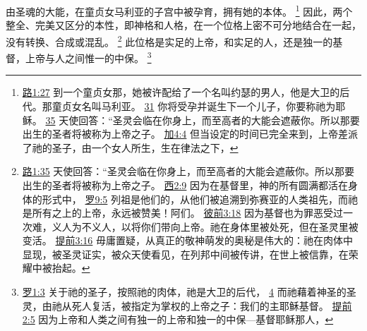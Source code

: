 \documentclass[12pt, a4paper, oneside]{ctexart}
\begin{document}
	由圣魂的大能，在童贞女马利亚的子宫中被孕育，拥有她的本体。
	\footnote {
		\href{https://biblehub.com/luke/1-27.htm}{路1:27} 到一个童贞女那，她被许配给了一个名叫约瑟的男人，他是大卫的后代。那童贞女名叫马利亚。
		\href{https://biblehub.com/luke/1-31.htm}{31} 你将受孕并诞生下一个儿子，你要称祂为耶稣。
		\href{https://biblehub.com/luke/1-35.htm}{35} 天使回答：“圣灵会临在你身上，而至高者的大能会遮蔽你。所以那要出生的圣者将被称为上帝之子。
		\href{https://biblehub.com/galatians/4-4.htm}{加4:4} 但当设定的时间已完全来到，上帝差派了祂的圣子，由一个女人所生，生在律法之下，
	}
	因此，两个整全、完美又区分的本性，即神格和人格，在一个位格上密不可分地结合在一起，没有转换、合成或混乱。
	\footnote {
		\href{https://biblehub.com/luke/1-35.htm}{路1:35} 天使回答：“圣灵会临在你身上，而至高者的大能会遮蔽你。所以那要出生的圣者将被称为上帝之子。
		\href{https://biblehub.com/colossians/2-9.htm}{西2:9} 因为在基督里，神的所有圆满都活在身体的形式中，
		\href{https://biblehub.com/romans/9-5.htm}{罗9:5} 列祖是他们的，从他们被追溯到弥赛亚的人类祖先，而祂是所有之上的上帝，永远被赞美！阿们。
		\href{https://biblehub.com/1_peter/3-18.htm}{彼前3:18} 因为基督也为罪恶受过一次难，义人为不义人，以将你们带向上帝。祂在身体里被处死，但在圣灵里被变活。
		\href{https://biblehub.com/1_timothy/3-16.htm}{提前3:16} 毋庸置疑，从真正的敬神萌发的奥秘是伟大的：祂在肉体中显现，被圣灵证实，被众天使看见，在列邦中间被传讲，在世上被信靠，在荣耀中被抬起。
	}
	此位格是实足的上帝，和实足的人，还是独一的基督，上帝与人之间惟一的中保。
	\footnote {
		\href{https://biblehub.com/romans/1-3.htm}{罗1:3} 关于祂的圣子，按照祂的肉体，祂是大卫的后代，
		\href{https://biblehub.com/romans/1-4.htm}{4} 而祂藉着神圣的圣灵，由祂从死人复活，被指定为掌权的上帝之子：我们的主耶稣基督。
		\href{https://biblehub.com/1_timothy/2-5.htm}{提前2:5} 因为上帝和人类之间有独一的上帝和独一的中保---基督耶稣那人，
	}
\end{document}
